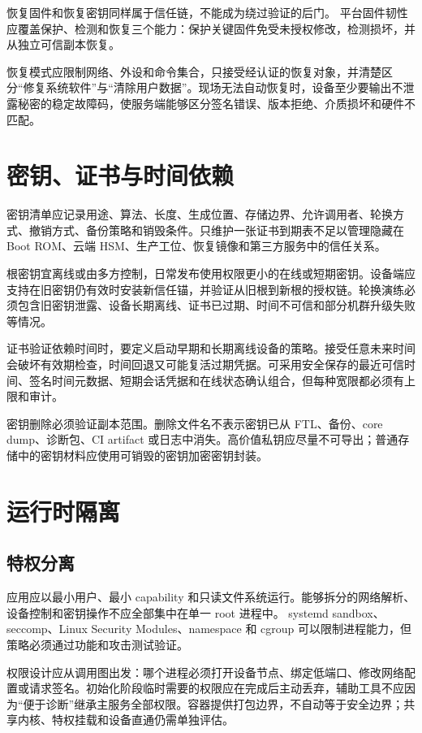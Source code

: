恢复固件和恢复密钥同样属于信任链，不能成为绕过验证的后门。
平台固件韧性应覆盖保护、检测和恢复三个能力\cite{nist-platform-resiliency}：保护关键固件免受未授权修改，检测损坏，并从独立可信副本恢复。

恢复模式应限制网络、外设和命令集合，只接受经认证的恢复对象，并清楚区分“修复系统软件”与“清除用户数据”。现场无法自动恢复时，设备至少要输出不泄露秘密的稳定故障码，使服务端能够区分签名错误、版本拒绝、介质损坏和硬件不匹配。

\section{密钥、证书与时间依赖}

密钥清单应记录用途、算法、长度、生成位置、存储边界、允许调用者、轮换方式、撤销方式、备份策略和销毁条件。只维护一张证书到期表不足以管理隐藏在 Boot ROM、云端 HSM、生产工位、恢复镜像和第三方服务中的信任关系。

根密钥宜离线或由多方控制，日常发布使用权限更小的在线或短期密钥。设备端应支持在旧密钥仍有效时安装新信任锚，并验证从旧根到新根的授权链。轮换演练必须包含旧密钥泄露、设备长期离线、证书已过期、时间不可信和部分机群升级失败等情况。

证书验证依赖时间时，要定义启动早期和长期离线设备的策略。接受任意未来时间会破坏有效期检查，时间回退又可能复活过期凭据。可采用安全保存的最近可信时间、签名时间元数据、短期会话凭据和在线状态确认组合，但每种宽限都必须有上限和审计。

密钥删除必须验证副本范围。删除文件名不表示密钥已从 FTL、备份、core dump、诊断包、CI artifact 或日志中消失。高价值私钥应尽量不可导出；普通存储中的密钥材料应使用可销毁的密钥加密密钥封装。

\section{运行时隔离}

\subsection{特权分离}

应用应以最小用户、最小 capability 和只读文件系统运行。能够拆分的网络解析、设备控制和密钥操作不应全部集中在单一 root 进程中。
systemd sandbox、seccomp、Linux Security Modules、namespace 和 cgroup 可以限制进程能力，但策略必须通过功能和攻击测试验证。

权限设计应从调用图出发：哪个进程必须打开设备节点、绑定低端口、修改网络配置或请求签名。初始化阶段临时需要的权限应在完成后主动丢弃，辅助工具不应因为“便于诊断”继承主服务全部权限。容器提供打包边界，不自动等于安全边界；共享内核、特权挂载和设备直通仍需单独评估。

